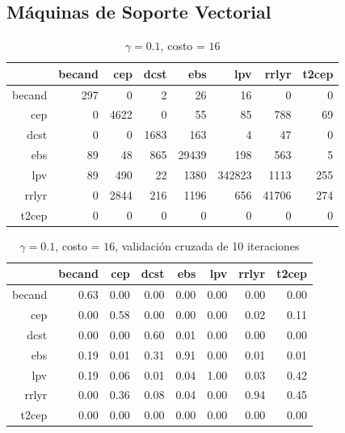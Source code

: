 \documentclass[letterpaper,12pt]{book}
\begin{document}
\subsection{Máquinas de Soporte Vectorial}

\begin{table}[ht]
  \centering
  \caption{$\gamma = 0.1$, costo = $16$} 
  \label{table:cmSvm}
  \begin{tabular}{rrrrrrrr}
    \hline
    & becand & cep & dcst & ebs & lpv & rrlyr & t2cep \\ 
    \hline
    becand & 297 &   0 &   2 &  26 &  16 &   0 &   0 \\ 
    cep &   0 & 4622 &   0 &  55 &  85 & 788 &  69 \\ 
    dcst &   0 &   0 & 1683 & 163 &   4 &  47 &   0 \\ 
    ebs &  89 &  48 & 865 & 29439 & 198 & 563 &   5 \\ 
    lpv &  89 & 490 &  22 & 1380 & 342823 & 1113 & 255 \\ 
    rrlyr &   0 & 2844 & 216 & 1196 & 656 & 41706 & 274 \\ 
    t2cep &   0 &   0 &   0 &   0 &   0 &   0 &   0 \\ 
    \hline
  \end{tabular}
\end{table}

\begin{table}[ht]
  \centering
  \caption{$\gamma = 0.1$, costo = $16$, validación cruzada de 10 iteraciones} 
  \label{table:cmCvSvm}
  \begin{tabular}{rrrrrrrr}
    \hline
    & becand & cep & dcst & ebs & lpv & rrlyr & t2cep \\ 
    \hline
    becand & 0.63 & 0.00 & 0.00 & 0.00 & 0.00 & 0.00 & 0.00 \\ 
    cep & 0.00 & 0.58 & 0.00 & 0.00 & 0.00 & 0.02 & 0.11 \\ 
    dcst & 0.00 & 0.00 & 0.60 & 0.01 & 0.00 & 0.00 & 0.00 \\ 
    ebs & 0.19 & 0.01 & 0.31 & 0.91 & 0.00 & 0.01 & 0.01 \\ 
    lpv & 0.19 & 0.06 & 0.01 & 0.04 & 1.00 & 0.03 & 0.42 \\ 
    rrlyr & 0.00 & 0.36 & 0.08 & 0.04 & 0.00 & 0.94 & 0.45 \\ 
    t2cep & 0.00 & 0.00 & 0.00 & 0.00 & 0.00 & 0.00 & 0.00 \\ 
    \hline
  \end{tabular}
\end{table}
\end{document}
